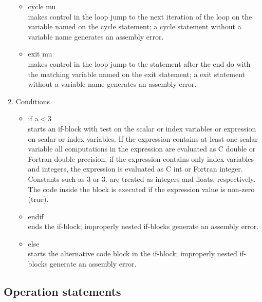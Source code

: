 \documentclass[12pt]{article}
\begin{document}
\begin{enumerate}
\begin{itemize}
\item cycle mu\\ 
makes control in the loop jump to the next iteration of the loop on the variable named on 
the cycle statement; a cycle statement without a variable name generates an assembly error.

\item exit mu\\ 
makes control in the loop jump to the statement after the end do with the matching variable 
named on the exit statement; a exit statement without a variable name generates an assembly error.

\end{itemize} 

\item Conditions
\begin{itemize} 
\item if a$<$3\\ 
starts an if-block with test on the scalar or index variables or expression on scalar or 
index variables. If the expression contains at least one scalar variable all computations 
in the expression are evaluated as C double or Fortran double precision, if the expression 
contains only index variables and integers, the expression is evaluated as C int or Fortran 
integer. Constants such as 3 or 3. are treated as integers and floats, respectively. The 
code inside the block is executed if the expression value is non-zero (true).

\item endif\\ 
ends the if-block; improperly nested if-blocks generate an assembly error.

\item else\\ 
starts the alternative code block in the if-block; improperly nested if-blocks generate an 
assembly error.
 \end{itemize} 

\end{enumerate} 


\subsection{Operation statements} 
\end{document}
